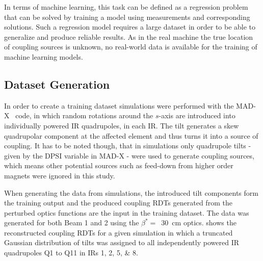In terms of machine learning, this task can be defined as a regression problem that can be solved by training a model using measurements and corresponding solutions.
Such a regression model requires a large dataset in order to be able to generalize and produce reliable results.
As in the real machine the true location of coupling sources is unknown, no real-world data is available for the training of machine learning models.

\subsection{Dataset Generation}

In order to create a training dataset simulations were performed with the \acrshort{MAD}-X~\cite{CODE:MADX_guide} code, in which random rotations around the \(s\)-axis are introduced into individually powered IR quadrupoles, in each IR.
The tilt generates a \gls{skew} quadrupolar component at the affected element and thus turns it into a source of coupling.
It has to be noted though, that in simulations only quadrupole tilts - given by the \(\mathrm{DPSI}\) variable in MAD-X - were used to generate coupling sources, which means other potential sources such as feed-down from higher order magnets were ignored in this study.

When generating the data from simulations, the introduced tilt components form the training output and the produced coupling RDTs generated from the perturbed optics functions are the input in the training dataset.
The data was generated for both Beam 1 and 2 using the \(\beta^{\ast}=\)~\qty{30}{\centi\meter} optics.
 shows the reconstructed coupling RDTs for a given simulation in which a truncated Gaussian distribution of tilts was assigned to all independently powered IR quadrupoles Q\num{1} to Q\num{11} in IRs \numlist{1;2;5;8}.

